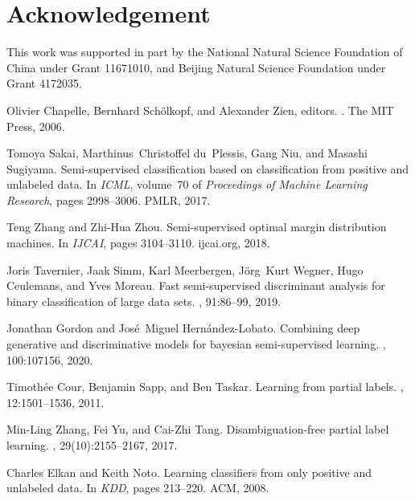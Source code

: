\documentclass[]{article} \usepackage{geometry}
\begin{document}
\section*{Acknowledgement}
This work was supported in part by the National Natural Science Foundation of China under Grant 11671010, and Beijing Natural Science Foundation under Grant 4172035.

\begin{thebibliography}{10}

Olivier Chapelle, Bernhard Sch{\"{o}}lkopf, and Alexander Zien, editors.
.
\newblock The {MIT} Press, 2006.

Tomoya Sakai, Marthinus~Christoffel du~Plessis, Gang Niu, and Masashi Sugiyama.
\newblock Semi-supervised classification based on classification from positive
  and unlabeled data.
\newblock In {\em {ICML}}, volume~70 of {\em Proceedings of Machine Learning
  Research}, pages 2998--3006. {PMLR}, 2017.

Teng Zhang and Zhi{-}Hua Zhou.
\newblock Semi-supervised optimal margin distribution machines.
\newblock In {\em {IJCAI}}, pages 3104--3110. ijcai.org, 2018.

Joris Tavernier, Jaak Simm, Karl Meerbergen, J{\"{o}}rg~Kurt Wegner, Hugo
  Ceulemans, and Yves Moreau.
\newblock Fast semi-supervised discriminant analysis for binary classification
  of large data sets.
, 91:86--99, 2019.

Jonathan Gordon and Jos{\'{e}}~Miguel Hern{\'{a}}ndez{-}Lobato.
\newblock Combining deep generative and discriminative models for bayesian
  semi-supervised learning.
, 100:107156, 2020.

Timoth{\'{e}}e Cour, Benjamin Sapp, and Ben Taskar.
\newblock Learning from partial labels.
, 12:1501--1536, 2011.

Min{-}Ling Zhang, Fei Yu, and Cai{-}Zhi Tang.
\newblock Disambiguation-free partial label learning.
, 29(10):2155--2167, 2017.

Charles Elkan and Keith Noto.
\newblock Learning classifiers from only positive and unlabeled data.
\newblock In {\em {KDD}}, pages 213--220. {ACM}, 2008.


\end{thebibliography}
\end{document}
